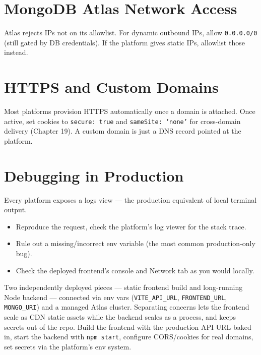 \section{MongoDB Atlas Network Access}

Atlas rejects IPs not on its allowlist. For dynamic outbound IPs, allow \texttt{0.0.0.0/0} (still gated by DB credentials). If the platform gives static IPs, allowlist those instead.

\section{HTTPS and Custom Domains}

Most platforms provision HTTPS automatically once a domain is attached. Once active, set cookies to \texttt{secure: true} and \texttt{sameSite: 'none'} for cross-domain delivery (Chapter 19). A custom domain is just a DNS record pointed at the platform.

\section{Debugging in Production}

Every platform exposes a logs view --- the production equivalent of local terminal output.

\begin{itemize}
\item Reproduce the request, check the platform's log viewer for the stack trace.
\item Rule out a missing/incorrect env variable (the most common production-only bug).
\item Check the deployed frontend's console and Network tab as you would locally.
\end{itemize}

\whatwhyhow
{Two independently deployed pieces --- static frontend build and long-running Node backend --- connected via env vars (\texttt{VITE\_API\_URL}, \texttt{FRONTEND\_URL}, \texttt{MONGO\_URI}) and a managed Atlas cluster.}
{Separating concerns lets the frontend scale as CDN static assets while the backend scales as a process, and keeps secrets out of the repo.}
{Build the frontend with the production API URL baked in, start the backend with \texttt{npm start}, configure CORS/cookies for real domains, set secrets via the platform's env system.}
